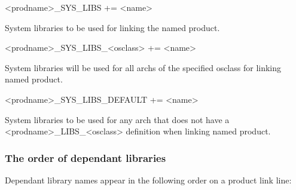 \begin{description}\item \textless{}prodname\textgreater{}\_SYS\_LIBS += \textless{}name\textgreater{}

\end{description}System libraries to be used for linking the named product.

\begin{description}\item \textless{}prodname\textgreater{}\_SYS\_LIBS\_\textless{}osclass\textgreater{} += \textless{}name\textgreater{}

\end{description}System libraries will be used for all archs of the specified osclass for linking named product.

\begin{description}\item \textless{}prodname\textgreater{}\_SYS\_LIBS\_DEFAULT += \textless{}name\textgreater{}

\end{description}System libraries to be used for any arch that does not have a \textless{}prodname\textgreater{}\_LIBS\_\textless{}osclass\textgreater{} definition when 
linking named product.

\subsubsection{The order of dependant libraries}

Dependant library names appear in the following order on a product link line:


